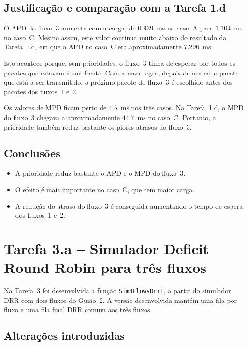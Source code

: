 \documentclass[11pt,a4paper]{article}
\begin{document}
\subsection*{Justificação e comparação com a Tarefa 1.d}

O APD do fluxo~3 aumenta com a carga, de $0.939$~ms no caso~A para
$1.104$~ms no caso~C. Mesmo assim, este valor continua muito abaixo do
resultado da Tarefa~1.d, em que o APD no caso~C era aproximadamente
$7.296$~ms.

Isto acontece porque, sem prioridades, o fluxo~3 tinha de esperar por todos os
pacotes que estavam à sua frente. Com a nova regra, depois de acabar o pacote
que está a ser transmitido, o próximo pacote do fluxo~3 é escolhido antes dos
pacotes dos fluxos~1 e~2.

Os valores de MPD ficam perto de $4.5$~ms nos três casos. Na Tarefa~1.d, o MPD
do fluxo~3 chegava a aproximadamente $44.7$~ms no caso~C. Portanto, a
prioridade também reduz bastante os piores atrasos do fluxo~3.

\subsection*{Conclusões}

\begin{itemize}
    \item A prioridade reduz bastante o APD e o MPD do fluxo~3.
    \item O efeito é mais importante no caso~C, que tem maior carga.
    \item A redução do atraso do fluxo~3 é conseguida aumentando o tempo de
    espera dos fluxos~1 e~2.
\end{itemize}


\newpage

\section{Tarefa 3.a -- Simulador Deficit Round Robin para três fluxos}

Na Tarefa~3 foi desenvolvida a função \texttt{Sim3FlowsDrrT}, a partir do
simulador DRR com dois fluxos do Guião~2. A versão desenvolvida mantém uma fila
por fluxo e uma fila final DRR comum aos três fluxos.

\subsection*{Alterações introduzidas}
\end{document}
